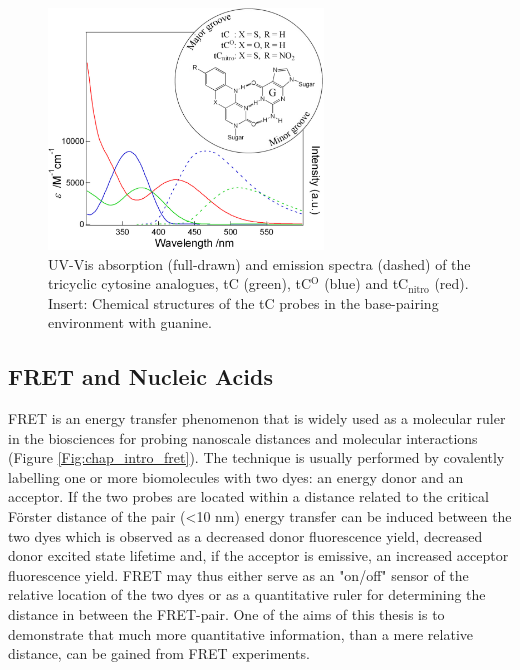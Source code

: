 \begin{figure}
    \centering
        \includegraphics[width=0.65\textwidth]{adds//tcprobes.png}
    \captionsetup{width=.95\textwidth}
    \caption{UV-Vis absorption (full-drawn) and emission spectra (dashed) of the tricyclic cytosine analogues, tC (green), tC$^\mathrm{O}$ (blue) and tC$_\mathrm{nitro}$ (red). Insert: Chemical structures of the tC probes in the base-pairing environment with guanine.}
    \label{Fig:chap_intro_tcprobes}
\end{figure}

\subsection{FRET and Nucleic Acids}
 FRET is an energy transfer phenomenon that is widely used as a molecular ruler in the biosciences for probing nanoscale distances and molecular interactions (Figure \ref{Fig:chap_intro_fret}).\cite{Lak} The technique is usually performed by covalently labelling one or more biomolecules with two dyes: an energy donor and an acceptor. If the two probes are located within a distance related to the critical Förster distance of the pair (<10 nm) energy transfer can be induced between the two dyes which is observed as a decreased donor fluorescence yield, decreased donor excited state lifetime and, if the acceptor is emissive, an increased acceptor fluorescence yield. FRET may thus either serve as an "on/off" sensor of the relative location of the two dyes or as a quantitative ruler for determining the distance in between the FRET-pair. One of the aims of this thesis is to demonstrate that much more quantitative information, than a mere relative distance, can be gained from FRET experiments.


